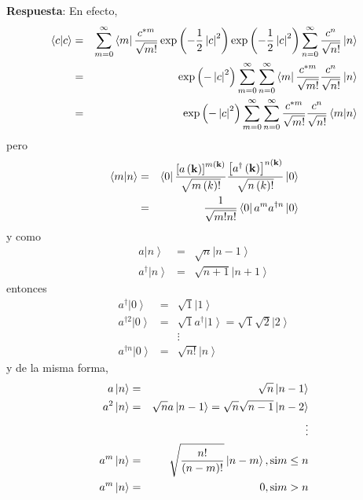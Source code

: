 \begin{enumerate}
\begin{enumerate}
\textbf{Respuesta}: En efecto,
\begin{eqnarray*}
\left\langle c|c\right> &=&\sum_{m=0}^{\infty }\left\langle m\right| 
\frac{c^{\ast m}}{\sqrt{m!}}\exp \left( -\frac{1}{2}\left| c\right|
^{2}\right) \exp \left( -\frac{1}{2}\left| c\right| ^{2}\right)
\sum_{n=0}^{\infty }\frac{c^{n}}{\sqrt{n!}}\left| n\right> \\
&=&\exp \left( -\left| c\right| ^{2}\right) \sum_{m=0}^{\infty
}\sum_{n=0}^{\infty }\left\langle m\right| \frac{c^{\ast m}}{\sqrt{m!}}\frac{%
c^{n}}{\sqrt{n!}}\left| n\right> \\
&=&\exp \left( -\left| c\right| ^{2}\right) \sum_{m=0}^{\infty
}\sum_{n=0}^{\infty }\frac{c^{\ast m}}{\sqrt{m!}}\frac{c^{n}}{\sqrt{n!}}%
\left\langle m|n\right> 
\end{eqnarray*}
pero 
\begin{eqnarray*}
\left\langle m|n\right> &=&\left\langle 0\right| \frac{\left[ a\left( 
{\bf k}\right) \right] ^{m\left( {\bf k}\right) }}{\sqrt{m\left(
k\right) !}}\frac{\left[ a^{\dagger }\left( {\bf k}\right) \right]
^{n\left( {\bf k}\right) }}{\sqrt{n\left( k\right) !}}\left|
0\right> \\
&=&\frac{1}{\sqrt{m!n!}}\left\langle 0\right| a^{m}a^{\dagger n}\left|
0\right> 
\end{eqnarray*}
y como 
\begin{eqnarray*}
a\left| n\right> &=&\sqrt{n}\left| n-1\right> \\
a^{\dagger }\left| n\right> &=&\sqrt{n+1}\left| n+1\right> 
\end{eqnarray*}
entonces 
\begin{eqnarray*}
a^{\dagger }\left| 0\right> &=&\sqrt{1}\left| 1\right> \\
a^{\dagger 2}\left| 0\right> &=&\sqrt{1}a^{\dagger }\left|
1\right> =\sqrt{1}\sqrt{2}\left| 2\right> \\
&&\vdots \\
a^{\dagger n}\left| 0\right> &=&\sqrt{n!}\left| n\right> 
\end{eqnarray*}
y de la misma forma, 
\begin{eqnarray*}
a\left| n\right> &=&\sqrt{n}\left| n-1\right> \\
a^{2}\left| n\right> &=&\sqrt{n}a\left| n-1\right> =\sqrt{n}%
\sqrt{n-1}\left| n-2\right> \\
&&\vdots \\
a^{m}\left| n\right> &=&\sqrt{\frac{n!}{\left( n-m\right) !}}\left|
n-m\right> {\rm , si }m\leq n \\
a^{m}\left| n\right> &=&0{\rm , si }m>n

\end{eqnarray*}
\end{enumerate}
\end{enumerate}
